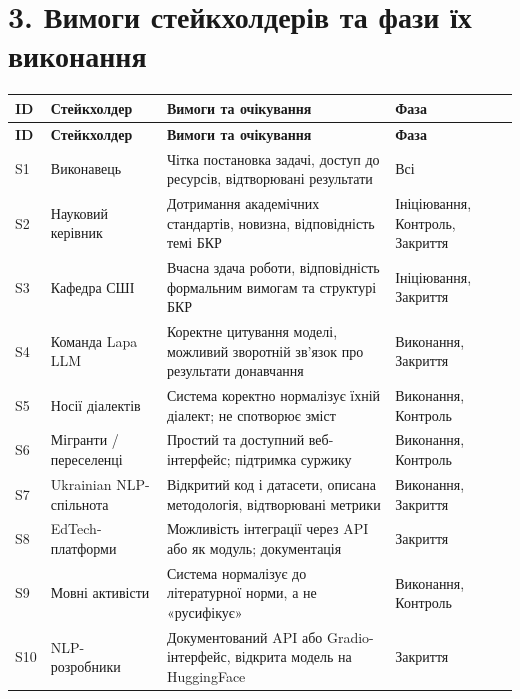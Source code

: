 \documentclass[14pt]{extarticle}
\begin{document}
\section*{3. Вимоги стейкхолдерів та фази їх виконання}

\begin{longtable}{|p{}|p{}|p{}|p{}|}
\hline
\textbf{ID} & \textbf{Стейкхолдер} & \textbf{Вимоги та очікування} & \textbf{Фаза} \\
\hline
\endfirsthead
\hline
\textbf{ID} & \textbf{Стейкхолдер} & \textbf{Вимоги та очікування} & \textbf{Фаза} \\
\hline
\endhead
S1 & Виконавець & Чітка постановка задачі, доступ до ресурсів, відтворювані результати & Всі \\
\hline
S2 & Науковий керівник & Дотримання академічних стандартів, новизна, відповідність темі БКР & Ініціювання, Контроль, Закриття \\
\hline
S3 & Кафедра СШІ & Вчасна здача роботи, відповідність формальним вимогам та структурі БКР & Ініціювання, Закриття \\
\hline
S4 & Команда Lapa LLM & Коректне цитування моделі, можливий зворотній зв'язок про результати донавчання & Виконання, Закриття \\
\hline
S5 & Носії діалектів & Система коректно нормалізує їхній діалект; не спотворює зміст & Виконання, Контроль \\
\hline
S6 & Мігранти / переселенці & Простий та доступний веб-інтерфейс; підтримка суржику & Виконання, Контроль \\
\hline
S7 & Ukrainian NLP-спільнота & Відкритий код і датасети, описана методологія, відтворювані метрики & Виконання, Закриття \\
\hline
S8 & EdTech-платформи & Можливість інтеграції через API або як модуль; документація & Закриття \\
\hline
S9 & Мовні активісти & Система нормалізує до літературної норми, а не «русифікує» & Виконання, Контроль \\
\hline
S10 & NLP-розробники & Документований API або Gradio-інтерфейс, відкрита модель на HuggingFace & Закриття \\
\hline
\end{longtable}

\end{document}
